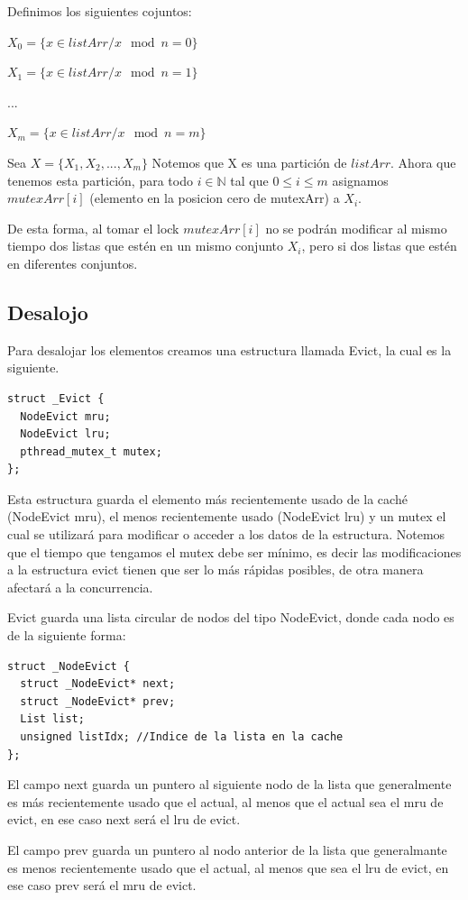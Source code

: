 \documentclass{article}
\begin{document}
Definimos los siguientes cojuntos:

$X_0 =\{x\in listArr/x\mod n=0\}$

$X_1 =\{x\in listArr/x \mod n=1\}$

...

$X_m =\{x\in listArr/x \mod n=m\}$ 

Sea $X = \{X_1, X_2, ... , X_m\}$
Notemos que X es una partición de $listArr$. Ahora que
tenemos esta partición, para todo $i\in \mathbb{N}$ tal que
$0 \leq i \leq m$
asignamos $mutexArr[i]$ (elemento
en la posicion cero de mutexArr) a $X_i$.

De esta forma, al tomar el lock $mutexArr[i]$ no
se podrán modificar al mismo tiempo dos
listas que estén en un mismo conjunto $X_i$, pero si
dos listas que estén en diferentes conjuntos.

\subsection{Desalojo}
Para desalojar los elementos creamos una estructura llamada
Evict, la cual es la siguiente.

\begin{lstlisting}[style=CStyle]
struct _Evict {  
  NodeEvict mru;
  NodeEvict lru;
  pthread_mutex_t mutex;  
};
\end{lstlisting}

Esta estructura guarda el elemento más recientemente
usado de la caché (NodeEvict mru), el menos
recientemente usado (NodeEvict lru) y un mutex el cual
se utilizará para modificar o acceder a los datos de
la estructura. Notemos que el tiempo que tengamos el
mutex debe ser mínimo, es decir las modificaciones a 
la estructura evict tienen que ser lo más rápidas
posibles, de otra manera afectará a la concurrencia.

Evict guarda una lista circular de nodos del tipo
NodeEvict, donde cada nodo es de la siguiente forma:
\begin{lstlisting}[style=CStyle]
struct _NodeEvict {
  struct _NodeEvict* next;
  struct _NodeEvict* prev;
  List list;
  unsigned listIdx; //Indice de la lista en la cache
};
\end{lstlisting}

El campo next guarda un puntero al siguiente nodo de
la lista que generalmente es más recientemente usado
que el actual, al menos que el actual sea el mru de
evict, en ese caso next será el lru de evict.

El campo prev guarda un puntero al nodo anterior de la
lista que generalmante es menos recientemente usado
que el actual, al menos que sea el lru de evict, en ese
caso prev será el mru de evict.
\end{document}
